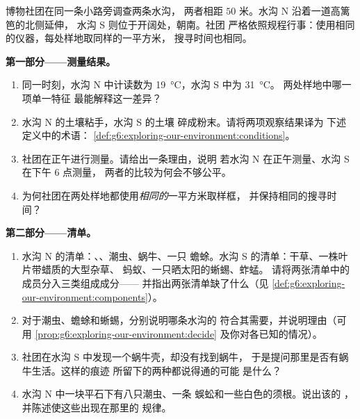 \begin{problem}\label{pb:g6:exploring-our-environment:1}
博物社团在同一条小路旁调查两条水沟，
两者相距 $50$ 米。水沟 N 沿着一道高篱笆的北侧延伸，
水沟 S 则位于开阔处，朝南。社团
严格依照规程行事：使用相同的仪器，每处样地取同样的一平方米，
搜寻时间也相同。

\medskip\noindent\textbf{第一部分——测量结果。}
\begin{enumerate}
  \item 同一时刻，水沟 N 中计读数为
        \qty{19}{\degreeCelsius}，水沟 S 中为 \qty{31}{\degreeCelsius}。
        两处样地中哪一项单一特征
        最能解释这一差异？
  \item 水沟 N 的土壤粘手，水沟 S 的土壤
        碎成粉末。请将两项观察结果译为
        下述定义中的术语：
        \cref{def:g6:exploring-our-environment:conditions}。
  \item 社团在正午进行测量。请给出一条理由，说明
        若水沟 N 在正午测量、水沟 S 在下午 6 点测量，
        两者的比较为何会不够公平。
  \item 为何社团在两处样地都使用\emph{相同的}一平方米取样框，
        并保持相同的搜寻时间？
\end{enumerate}

\medskip\noindent\textbf{第二部分——清单。}
\begin{enumerate}[resume]
  \item 水沟 N 的清单：、、潮虫、蜗牛、一只
        蟾蜍。水沟 S 的清单：干草、一株叶片带蜡质的大型杂草、
        蚂蚁、一只晒太阳的蜥蜴、蚱蜢。
        请将两张清单中的成员分入三类组成成分——
        并指出两张清单缺了什么（见
        \cref{def:g6:exploring-our-environment:components}）。
  \item 对于潮虫、蟾蜍和蜥蜴，分别说明哪条水沟的
        符合其需要，并说明理由（可用
        \cref{prop:g6:exploring-our-environment:decide}
        及你对各已知的情况）。
  \item 社团在水沟 S 中发现一个蜗牛壳，却没有找到蜗牛，
        于是提问那里是否有蜗牛生活。这样的痕迹
        所留下的两种都说得通的可能
        是什么？
  \item 水沟 N 中一块平石下有八只潮虫、一条
        蜈蚣和一些白色的须根。说出该的
        ，并陈述使这些出现在那里的
        规律。
\end{enumerate}


\end{problem}
